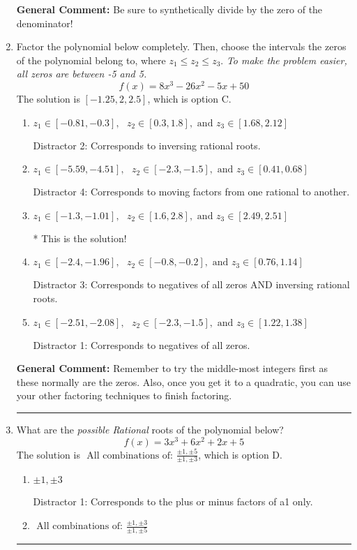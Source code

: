 \documentclass{extbook}[14pt]
\newcommand{\litem}[1]{\item #1

\rule{\textwidth}{0.4pt}}
\begin{document}
\begin{enumerate}
{\textbf{General Comment:} Be sure to synthetically divide by the zero of the denominator!
}
\litem{
Factor the polynomial below completely. Then, choose the intervals the zeros of the polynomial belong to, where $z_1 \leq z_2 \leq z_3$. \textit{To make the problem easier, all zeros are between -5 and 5.}
\[ f(x) = 8x^{3} -26 x^{2} -5 x + 50 \]The solution is \( [-1.25, 2, 2.5] \), which is option C.\begin{enumerate}[label=\Alph*.]
\item \( z_1 \in [-0.81, -0.3], \text{   }  z_2 \in [0.3, 1.8], \text{   and   } z_3 \in [1.68, 2.12] \)

 Distractor 2: Corresponds to inversing rational roots.
\item \( z_1 \in [-5.59, -4.51], \text{   }  z_2 \in [-2.3, -1.5], \text{   and   } z_3 \in [0.41, 0.68] \)

 Distractor 4: Corresponds to moving factors from one rational to another.
\item \( z_1 \in [-1.3, -1.01], \text{   }  z_2 \in [1.6, 2.8], \text{   and   } z_3 \in [2.49, 2.51] \)

* This is the solution!
\item \( z_1 \in [-2.4, -1.96], \text{   }  z_2 \in [-0.8, -0.2], \text{   and   } z_3 \in [0.76, 1.14] \)

 Distractor 3: Corresponds to negatives of all zeros AND inversing rational roots.
\item \( z_1 \in [-2.51, -2.08], \text{   }  z_2 \in [-2.3, -1.5], \text{   and   } z_3 \in [1.22, 1.38] \)

 Distractor 1: Corresponds to negatives of all zeros.
\end{enumerate}

\textbf{General Comment:} Remember to try the middle-most integers first as these normally are the zeros. Also, once you get it to a quadratic, you can use your other factoring techniques to finish factoring.
}
\litem{
What are the \textit{possible Rational} roots of the polynomial below?
\[ f(x) = 3x^{3} +6 x^{2} +2 x + 5 \]The solution is \( \text{ All combinations of: }\frac{\pm 1,\pm 5}{\pm 1,\pm 3} \), which is option D.\begin{enumerate}[label=\Alph*.]
\item \( \pm 1,\pm 3 \)

 Distractor 1: Corresponds to the plus or minus factors of a1 only.
\item \( \text{ All combinations of: }\frac{\pm 1,\pm 3}{\pm 1,\pm 5} \)


\end{enumerate}}
\end{enumerate}
\end{document}
